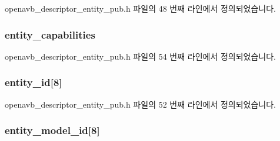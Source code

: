 openavb\+\_\+descriptor\+\_\+entity\+\_\+pub.\+h 파일의 48 번째 라인에서 정의되었습니다.

\subsubsection[{\texorpdfstring{entity\+\_\+capabilities}{entity_capabilities}}]{ entity\+\_\+capabilities}\hypertarget{structopenavb__aem__descriptor__entity__t_ac778b7422da24a5903fadab48c5d4850}{}\label{structopenavb__aem__descriptor__entity__t_ac778b7422da24a5903fadab48c5d4850}


openavb\+\_\+descriptor\+\_\+entity\+\_\+pub.\+h 파일의 54 번째 라인에서 정의되었습니다.

\subsubsection[{\texorpdfstring{entity\+\_\+id}{entity_id}}]{ entity\+\_\+id\mbox{[}8\mbox{]}}\hypertarget{structopenavb__aem__descriptor__entity__t_ab748fb58fac21e84c356282323c9b9e2}{}\label{structopenavb__aem__descriptor__entity__t_ab748fb58fac21e84c356282323c9b9e2}


openavb\+\_\+descriptor\+\_\+entity\+\_\+pub.\+h 파일의 52 번째 라인에서 정의되었습니다.

\subsubsection[{\texorpdfstring{entity\+\_\+model\+\_\+id}{entity_model_id}}]{ entity\+\_\+model\+\_\+id\mbox{[}8\mbox{]}}\hypertarget{structopenavb__aem__descriptor__entity__t_a10141ef89fe144c95be49eeb9a34b2d1}{}\label{structopenavb__aem__descriptor__entity__t_a10141ef89fe144c95be49eeb9a34b2d1}



